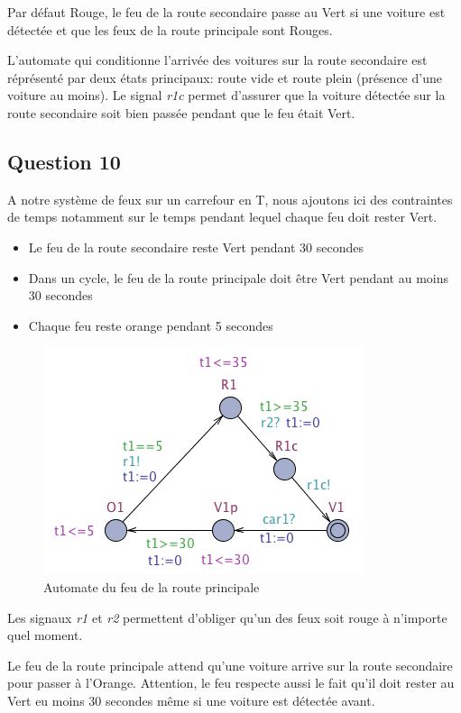 \documentclass[11pt]{article}
\begin{document}
Par défaut Rouge, le feu de la route secondaire passe au Vert si une voiture est détectée et que les feux de la route principale sont Rouges.

L'automate qui conditionne l'arrivée des voitures sur la route secondaire est réprésenté par deux états principaux: route vide et route plein (présence d'une voiture au moins). Le signal \emph{r1c} permet d'assurer que la voiture détectée sur la route secondaire soit bien passée pendant que le feu était Vert.

\subsection{Question 10}

A notre système de feux sur un carrefour en T, nous ajoutons ici des contraintes de temps notamment sur le temps pendant lequel chaque feu doit rester Vert.

\begin{itemize}
	\item Le feu de la route secondaire reste Vert pendant 30 secondes
	\item Dans un cycle, le feu de la route principale doit être Vert pendant au moins 30 secondes
	\item Chaque feu reste orange pendant 5 secondes
\end{itemize}

\begin{figure}[H]
	\centering
	\includegraphics[scale=0.5]{ressources/part3/Q10-1.png}
	\caption{Automate du feu de la route principale}
\end{figure}

Les signaux \emph{r1} et \emph{r2} permettent d'obliger qu'un des feux soit rouge à n'importe quel moment.

Le feu de la route principale attend qu'une voiture arrive sur la route secondaire pour passer à l'Orange. Attention, le feu respecte aussi le fait qu'il doit rester au Vert eu moins 30 secondes même si une voiture est détectée avant.
\end{document}
